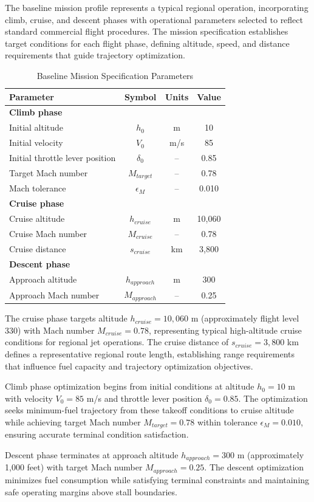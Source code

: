 The baseline mission profile represents a typical regional operation, incorporating climb, cruise, and descent phases with operational parameters selected to reflect standard commercial flight procedures. The mission specification establishes target conditions for each flight phase, defining altitude, speed, and distance requirements that guide trajectory optimization. 

\begin{table}[h]
    \centering
    \footnotesize
    \begin{tabular}{l c c c}
        \hline
        Parameter & Symbol & Units & Value \\
        \hline
        \textbf{Climb phase} & & & \\
        Initial altitude & $h_0$ & m & 10 \\
        Initial velocity & $V_0$ & m/s & 85 \\
        Initial throttle lever position & $\delta_0$ & -- & 0.85 \\
        Target Mach number & $M_{target}$ & -- & 0.78 \\
        Mach tolerance & $\epsilon_M$ & -- & 0.010 \\
        \hline
        \textbf{Cruise phase} & & & \\
        Cruise altitude & $h_{cruise}$ & m & 10{,}060 \\
        Cruise Mach number & $M_{cruise}$ & -- & 0.78 \\
        Cruise distance & $s_{cruise}$ & km & 3{,}800 \\
        \hline
        \textbf{Descent phase} & & & \\
        Approach altitude & $h_{approach}$ & m & 300 \\
        Approach Mach number & $M_{approach}$ & -- & 0.25 \\
        \hline
    \end{tabular}
    \caption{Baseline Mission Specification Parameters}
\end{table}

The cruise phase targets altitude $h_{cruise} = 10,060$ m (approximately flight level 330) with Mach number $M_{cruise} = 0.78$, representing typical high-altitude cruise conditions for regional jet operations. The cruise distance of $s_{cruise} = 3,800$ km defines a representative regional route length, establishing range requirements that influence fuel capacity and trajectory optimization objectives.

Climb phase optimization begins from initial conditions at altitude $h_0 = 10$ m with velocity $V_0 = 85$ m/s and throttle lever position $\delta_0 = 0.85$. The optimization seeks minimum-fuel trajectory from these takeoff conditions to cruise altitude while achieving target Mach number $M_{target} = 0.78$ within tolerance $\epsilon_M = 0.010$, ensuring accurate terminal condition satisfaction.

Descent phase terminates at approach altitude $h_{approach} = 300$ m (approximately 1,000 feet) with target Mach number $M_{approach} = 0.25$. The descent optimization minimizes fuel consumption while satisfying terminal constraints and maintaining safe operating margins above stall boundaries.
